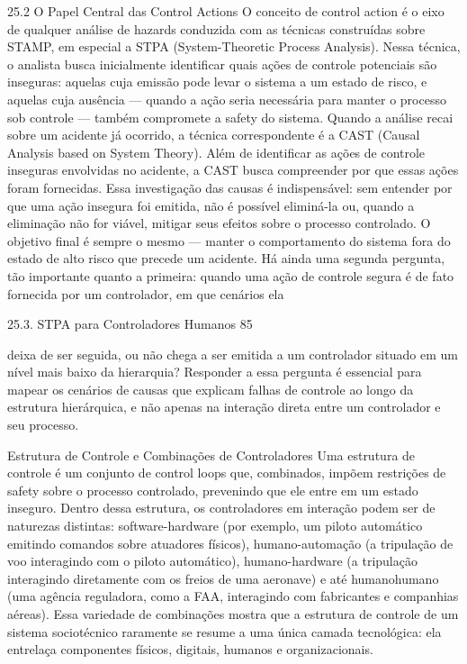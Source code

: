 25.2 O Papel Central das Control Actions O conceito de control action é o eixo de qualquer análise de hazards conduzida com as técnicas construídas sobre STAMP, em especial a STPA (System-Theoretic Process Analysis). Nessa técnica, o analista busca inicialmente identificar quais ações de controle potenciais são inseguras: aquelas cuja emissão pode levar o sistema a um estado de risco, e aquelas cuja ausência — quando a ação seria necessária para manter o processo sob controle — também compromete a safety do sistema. Quando a análise recai sobre um acidente já ocorrido, a técnica correspondente é a CAST (Causal Analysis based on System Theory). Além de identificar as ações de controle inseguras envolvidas no acidente, a CAST busca compreender por que essas ações foram fornecidas. Essa investigação das causas é indispensável: sem entender por que uma ação insegura foi emitida, não é possível eliminá-la ou, quando a eliminação não for viável, mitigar seus efeitos sobre o processo controlado. O objetivo final é sempre o mesmo — manter o comportamento do sistema fora do estado de alto risco que precede um acidente. Há ainda uma segunda pergunta, tão importante quanto a primeira: quando uma ação de controle segura é de fato fornecida por um controlador, em que cenários ela

25.3. STPA para Controladores Humanos 85

deixa de ser seguida, ou não chega a ser emitida a um controlador situado em um nível mais baixo da hierarquia? Responder a essa pergunta é essencial para mapear os cenários de causas que explicam falhas de controle ao longo da estrutura hierárquica, e não apenas na interação direta entre um controlador e seu processo.

Estrutura de Controle e Combinações de Controladores Uma estrutura de controle é um conjunto de control loops que, combinados, impõem restrições de safety sobre o processo controlado, prevenindo que ele entre em um estado inseguro. Dentro dessa estrutura, os controladores em interação podem ser de naturezas distintas: software-hardware (por exemplo, um piloto automático emitindo comandos sobre atuadores físicos), humano-automação (a tripulação de voo interagindo com o piloto automático), humano-hardware (a tripulação interagindo diretamente com os freios de uma aeronave) e até humanohumano (uma agência reguladora, como a FAA, interagindo com fabricantes e companhias aéreas). Essa variedade de combinações mostra que a estrutura de controle de um sistema sociotécnico raramente se resume a uma única camada tecnológica: ela entrelaça componentes físicos, digitais, humanos e organizacionais.

